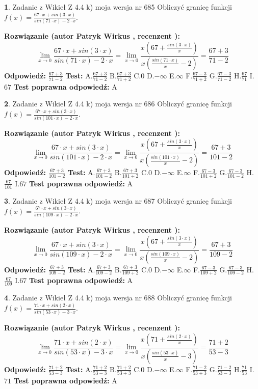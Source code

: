 \documentclass[12pt, a4paper]{article}
\theoremstyle{definition} %
\newtheorem{zad}{}
\newcommand{\zadStart}[1]{\begin{zad}#1\newline}
\newcommand{\zadStop}{\end{zad}}
\newcommand{\rozwStart}[2]{\noindent \textbf{Rozwiązanie (autor #1 , recenzent #2): }\newline}
\newcommand{\rozwStop}{\newline}
\newcommand{\odpStart}{\noindent \textbf{Odpowiedź:}\newline}
\newcommand{\odpStop}{\newline}
\newcommand{\testStart}{\noindent \textbf{Test:}\newline}
\newcommand{\testStop}{\newline}
\newcommand{\kluczStart}{\noindent \textbf{Test poprawna odpowiedź:}\newline}
\newcommand{\kluczStop}{\newline}
\begin{document}
\zadStart{Zadanie z Wikieł Z 4.4 k) moja wersja nr 685}
Obliczyć granicę funkcji $f(x)=\frac{67\cdot x +sin(3\cdot x)}{sin(71\cdot x) -2\cdot x}$.
\zadStop
\rozwStart{Patryk Wirkus}{}
$$\lim\limits_{x\to 0}\frac{67\cdot x +sin(3\cdot x)}{sin(71\cdot x) -2\cdot x}
=\lim\limits_{x\to 0}\frac{x(67+\frac{sin(3\cdot x)}{x})}{x(\frac{sin(71\cdot x)}{x}-2)}
=\frac{67+3}{71-2}$$
\rozwStop
\odpStart
$\frac{67+3}{71-2}$
\odpStop
\testStart
A.$\frac{67+3}{71-2}$
B.$\frac{67+3}{71+2}$
C.$0$
D.$-\infty$
E.$\infty$
F.$\frac{67-3}{71+2}$
G.$\frac{67-3}{71-2}$
H.$\frac{67}{71}$
I.$67$
\testStop
\kluczStart
A
\kluczStop



\zadStart{Zadanie z Wikieł Z 4.4 k) moja wersja nr 686}
Obliczyć granicę funkcji $f(x)=\frac{67\cdot x +sin(3\cdot x)}{sin(101\cdot x) -2\cdot x}$.
\zadStop
\rozwStart{Patryk Wirkus}{}
$$\lim\limits_{x\to 0}\frac{67\cdot x +sin(3\cdot x)}{sin(101\cdot x) -2\cdot x}
=\lim\limits_{x\to 0}\frac{x(67+\frac{sin(3\cdot x)}{x})}{x(\frac{sin(101\cdot x)}{x}-2)}
=\frac{67+3}{101-2}$$
\rozwStop
\odpStart
$\frac{67+3}{101-2}$
\odpStop
\testStart
A.$\frac{67+3}{101-2}$
B.$\frac{67+3}{101+2}$
C.$0$
D.$-\infty$
E.$\infty$
F.$\frac{67-3}{101+2}$
G.$\frac{67-3}{101-2}$
H.$\frac{67}{101}$
I.$67$
\testStop
\kluczStart
A
\kluczStop



\zadStart{Zadanie z Wikieł Z 4.4 k) moja wersja nr 687}
Obliczyć granicę funkcji $f(x)=\frac{67\cdot x +sin(3\cdot x)}{sin(109\cdot x) -2\cdot x}$.
\zadStop
\rozwStart{Patryk Wirkus}{}
$$\lim\limits_{x\to 0}\frac{67\cdot x +sin(3\cdot x)}{sin(109\cdot x) -2\cdot x}
=\lim\limits_{x\to 0}\frac{x(67+\frac{sin(3\cdot x)}{x})}{x(\frac{sin(109\cdot x)}{x}-2)}
=\frac{67+3}{109-2}$$
\rozwStop
\odpStart
$\frac{67+3}{109-2}$
\odpStop
\testStart
A.$\frac{67+3}{109-2}$
B.$\frac{67+3}{109+2}$
C.$0$
D.$-\infty$
E.$\infty$
F.$\frac{67-3}{109+2}$
G.$\frac{67-3}{109-2}$
H.$\frac{67}{109}$
I.$67$
\testStop
\kluczStart
A
\kluczStop



\zadStart{Zadanie z Wikieł Z 4.4 k) moja wersja nr 688}
Obliczyć granicę funkcji $f(x)=\frac{71\cdot x +sin(2\cdot x)}{sin(53\cdot x) -3\cdot x}$.
\zadStop
\rozwStart{Patryk Wirkus}{}
$$\lim\limits_{x\to 0}\frac{71\cdot x +sin(2\cdot x)}{sin(53\cdot x) -3\cdot x}
=\lim\limits_{x\to 0}\frac{x(71+\frac{sin(2\cdot x)}{x})}{x(\frac{sin(53\cdot x)}{x}-3)}
=\frac{71+2}{53-3}$$
\rozwStop
\odpStart
$\frac{71+2}{53-3}$
\odpStop
\testStart
A.$\frac{71+2}{53-3}$
B.$\frac{71+2}{53+3}$
C.$0$
D.$-\infty$
E.$\infty$
F.$\frac{71-2}{53+3}$
G.$\frac{71-2}{53-3}$
H.$\frac{71}{53}$
I.$71$
\testStop
\kluczStart
A
\kluczStop
\end{document}
